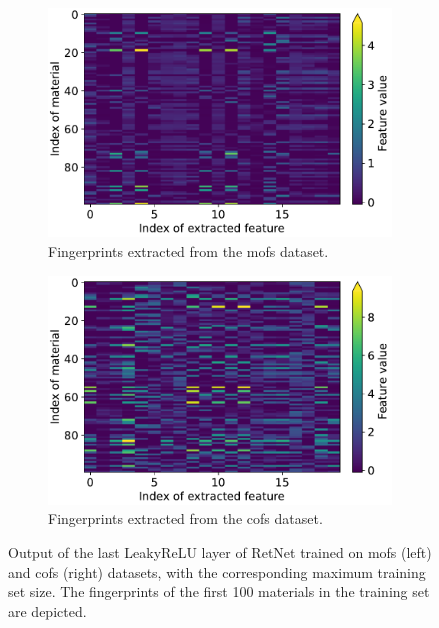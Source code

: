 \begin{figure}[!ht]
	\centering
	\begin{subfigure}[b]{0.49\textwidth}
		\includegraphics[width=\textwidth]{fig/extracted_features_mofs.pdf}
		\caption{Fingerprints extracted from the \glspl{mof} dataset.}
	\end{subfigure}
	\begin{subfigure}[b]{0.49\textwidth}
		\includegraphics[width=\textwidth]{fig/extracted_features_cofs.pdf}
		\caption{Fingerprints extracted from the \glspl{cof} dataset.}
	\end{subfigure}
	\caption[Fingerprints extracted from RetNet.]{Output of the last LeakyReLU
	layer of RetNet trained on \glspl{mof} (left) and \glspl{cof} (right)
	datasets, with the corresponding maximum training set size. The fingerprints
	of the first \num{100} materials in the training set are depicted.}
	\label{fig:fingerprints}
\end{figure}

